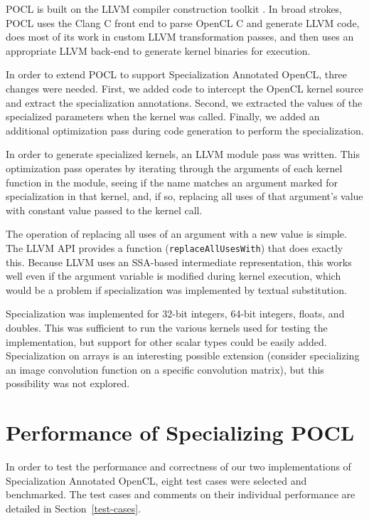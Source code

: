 \documentclass{acm_proc_article-sp}
\begin{document}
POCL is built on the LLVM compiler construction toolkit
\cite{Lattner:2002:LLVM}. In broad strokes, POCL uses the Clang C front end to
parse OpenCL C and generate LLVM code, does most of its work in custom LLVM
transformation passes, and then uses an appropriate LLVM back-end to generate
kernel binaries for execution.

In order to extend POCL to support Specialization Annotated OpenCL, three
changes were needed. First, we added code to intercept the OpenCL kernel source
and  extract the specialization annotations. Second, we extracted the values of
the specialized parameters when the kernel was called. Finally, we added an
additional optimization pass during code generation to perform the
specialization.

In order to generate specialized kernels, an LLVM module pass was written.
This optimization pass operates by iterating through the arguments of each
kernel function in the module, seeing if the name matches an argument marked
for specialization in that kernel, and, if so, replacing all uses of that
argument's value with constant value passed to the kernel call. 

The operation of replacing all uses of an argument with a new value is simple.
The LLVM API provides a function ({\tt replaceAllUsesWith}) that does exactly
this. Because LLVM uses an SSA-based intermediate representation, this works
well even if the argument variable is modified during kernel execution, which
would be a problem if specialization was implemented by textual substitution.

Specialization was implemented for 32-bit integers, 64-bit integers, floats,
and doubles. This was sufficient to run the various kernels used for testing the
implementation, but support for other scalar types could be easily added.
Specialization on arrays is an interesting possible extension (consider
specializing an image convolution function on a specific convolution matrix),
but this possibility was not explored.

\section{Performance of Specializing POCL}

In order to test the performance and correctness of our two implementations of
Specialization Annotated OpenCL, eight test cases were selected and benchmarked.
The test cases and comments on their individual performance are detailed in
Section~\ref{test-cases}. 
\end{document}
